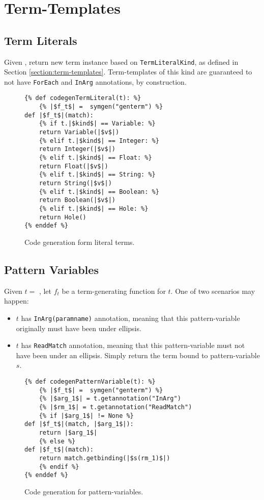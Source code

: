 \section{Term-Templates}

\subsection{Term Literals}

Given \TermLiteral, return new term instance based on \texttt{TermLiteralKind}, as defined in Section \ref{section:term-templates}. Term-templates of this kind are guaranteed to not have \texttt{ForEach} and \texttt{InArg} annotations, by construction.

\begin{figure}[H]
\begin{verbatim}
{% def codegenTermLiteral(t): %}
	{% |$f_t$| =  symgen("genterm") %}
def |$f_t$|(match):
	{% if t.|$kind$| == Variable: %}
	return Variable(|$v$|)
	{% elif t.|$kind$| == Integer: %}
	return Integer(|$v$|)
	{% elif t.|$kind$| == Float: %}
	return Float(|$v$|)
	{% elif t.|$kind$| == String: %}
	return String(|$v$|)
	{% elif t.|$kind$| == Boolean: %}
	return Boolean(|$v$|)
	{% elif t.|$kind$| == Hole: %}
	return Hole()
{% enddef %}
\end{verbatim}
\caption{Code generation form literal terms.}
\label{codegen-term-template-lit}
\end{figure}


\subsection{Pattern Variables}

Given $t =$ \PatternVariable, let $f_t$ be a term-generating function for $t$. One of two scenarios may happen:
\begin{itemize}
\item $t$ has \texttt{InArg(paramname)} annotation, meaning that this pattern-variable originally must have been under ellipsis.
\item $t$ has \texttt{ReadMatch} annotation, meaning that this pattern-variable must not have been under an ellipsis. Simply return the term bound to pattern-variable $s$.
\end{itemize}

\begin{figure}[htb]
\begin{verbatim}
{% def codegenPatternVariable(t): %}
	{% |$f_t$| =  symgen("genterm") %}
	{% |$arg_1$| = t.getannotation("InArg")
	{% |$rm_1$| = t.getannotation("ReadMatch")
	{% if |$arg_1$| != None %}
def |$f_t$|(match, |$arg_1$|):
	return |$arg_1$|
	{% else %}
def |$f_t$|(match):
	return match.getbinding(|$s(rm_1)$|)
	{% endif %}
{% enddef %}
\end{verbatim}
\caption{Code generation for pattern-variables.}
\label{codegen-term-pv}
\end{figure}

